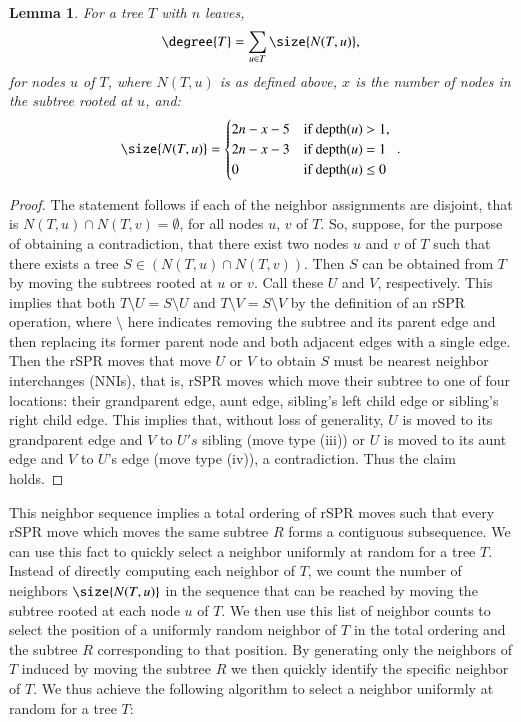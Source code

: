 \documentclass[]{elsarticle}
\newtheorem{lem}[thm]{Lemma}
\begin{document}
\begin{lem}
	\label{lem:compute_degree}
	For a tree $T$ with $n$ leaves,
	$$\degree{T} = \sum_{u \in T} \size{N(T,u)},$$
	for nodes $u$ of $T$, where $N(T,u)$ is as defined above, $x$ is the number of nodes in the subtree rooted at $u$, and:
	$$\size{N(T,u)} = \begin{cases}
		2n - x - 5 &\text{if depth($u$) $ > 1$, } \\
		2n - x - 3 &\text{if depth($u$) $ = 1$ } \\
		0 &\text{if depth($u$) $ \le 0$ } \\
	\end{cases}.$$
\end{lem}
\begin{proof}
	The statement follows if each of the neighbor assignments are disjoint, that is $N(T,u) \cap N(T,v) = \emptyset$, for all nodes $u$, $v$ of $T$.
	So, suppose, for the purpose of obtaining a contradiction, that there exist two nodes $u$ and $v$ of $T$ such that there exists a tree $S \in (N(T,u) \cap N(T,v))$.
	Then $S$ can be obtained from $T$ by moving the subtrees rooted at $u$ or $v$.
	Call these $U$ and $V$, respectively.
	This implies that both $T \setminus U = S \setminus U$ and $T \setminus V = S \setminus V$ by the definition of an rSPR operation, where $\setminus$ here indicates removing the subtree and its parent edge and then replacing its former parent node and both adjacent edges with a single edge.
	Then the rSPR moves that move $U$ or $V$ to obtain $S$ must be nearest neighbor interchanges (NNIs), that is, rSPR moves which move their subtree to one of four locations: their grandparent edge, aunt edge, sibling's left child edge or sibling's right child edge.
	This implies that, without loss of generality, $U$ is moved to its grandparent edge and $V$ to $U's$ sibling (move type (iii)) or $U$ is moved to its aunt edge and $V$ to $U$'s edge (move type (iv)), a contradiction.
	Thus the claim holds.
\end{proof}



This neighbor sequence implies a total ordering of rSPR moves such that every rSPR move which moves the same subtree $R$ forms a contiguous subsequence.
We can use this fact to quickly select a neighbor uniformly at random for a tree $T$.
Instead of directly computing each neighbor of $T$, we count the number of neighbors $\size{N(T,u)}$ in the sequence that can be reached by moving the subtree rooted at each node $u$ of $T$.
We then use this list of neighbor counts to select the position of a uniformly random neighbor of $T$ in the total ordering and the subtree $R$ corresponding to that position.
By generating only the neighbors of $T$ induced by moving the subtree $R$ we then quickly identify the specific neighbor of $T$.
We thus achieve the following algorithm to select a neighbor uniformly at random for a tree $T$:
\end{document}
